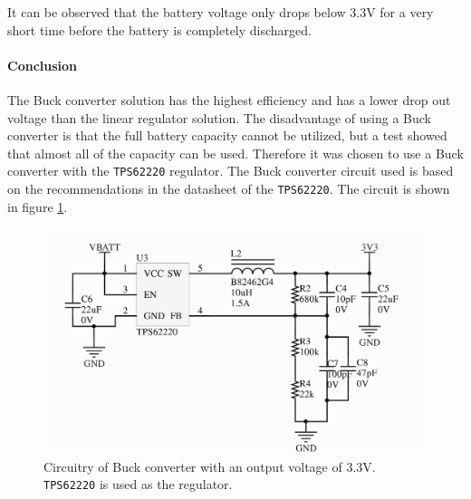 It can be observed that the battery voltage only drops below 3.3V for a very short time before the battery is completely discharged.

\paragraph{Conclusion}
The Buck converter solution has the highest efficiency and has a lower drop out voltage than the linear regulator solution.
The disadvantage of using a Buck converter is that the full battery capacity cannot be utilized, but a test showed that almost all of the capacity can be used.
Therefore it was chosen to use a Buck converter with the \texttt{TPS62220} regulator. 
The Buck converter circuit used is based on the recommendations in the datasheet of the \texttt{TPS62220}.
The circuit is shown in figure \ref{fig:tps62220_circuit}.

\begin{figure}[h]
	\centering
    \includegraphics[width=.8\linewidth]{graphics/tps6220_circuit}
	\caption[3.3 V buck converter circuitry.]{Circuitry of Buck converter with an output voltage of 3.3V. \texttt{TPS62220} is used as the regulator.}
	\label{fig:tps62220_circuit}
\end{figure}
